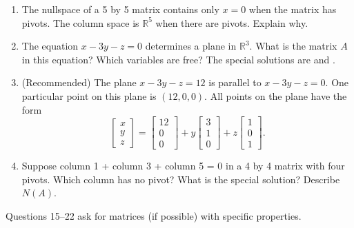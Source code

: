 \documentclass[14pt, a4paper]{article}
\begin{document}
\begin{enumerate}[resume]
    \item The nullspace of a 5 by 5 matrix contains only $x = 0$ when the matrix has \underline{\hspace{2cm}} pivots. The column space is $\mathbb{R}^5$ when there are \underline{\hspace{2cm}} pivots. Explain why.

    \item The equation $x - 3y - z = 0$ determines a plane in $\mathbb{R}^3$. What is the matrix $A$ in this equation? Which variables are free? The special solutions are \underline{\hspace{2cm}} and \underline{\hspace{2cm}}.

    \item (Recommended) The plane $x - 3y - z = 12$ is parallel to $x - 3y - z = 0$. One particular point on this plane is $(12, 0, 0)$. All points on the plane have the form
          \[
              \begin{bmatrix} x \\ y \\ z \end{bmatrix}
              =
              \begin{bmatrix} 12 \\ 0 \\ 0 \end{bmatrix}
              + y \begin{bmatrix} 3 \\ 1 \\ 0 \end{bmatrix}
              + z \begin{bmatrix} 1 \\ 0 \\ 1 \end{bmatrix}.
          \]

    \item Suppose column 1 + column 3 + column 5 = 0 in a 4 by 4 matrix with four pivots. Which column has no pivot? What is the special solution? Describe $N(A)$.
\end{enumerate}

\noindent Questions 15--22 ask for matrices (if possible) with specific properties.
\end{document}
